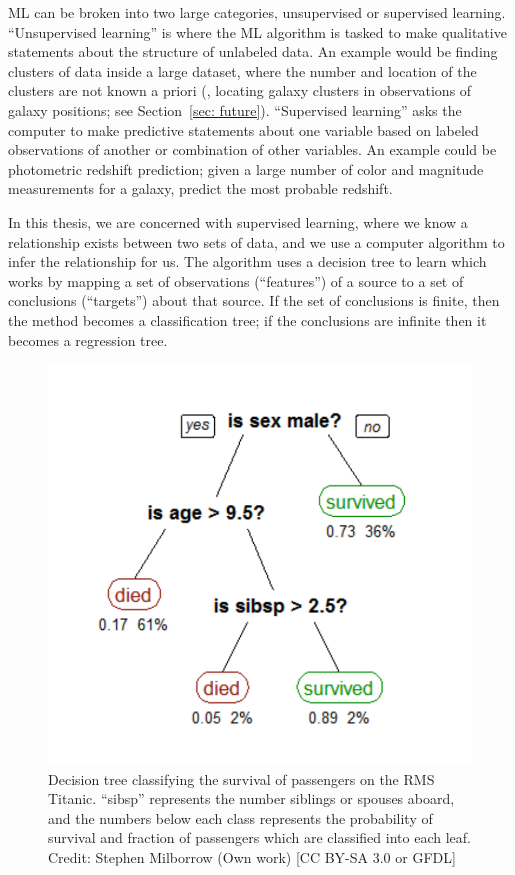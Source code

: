 ML can be broken into two large categories, unsupervised or supervised learning. ``Unsupervised learning'' is where the ML algorithm is tasked to make qualitative statements about the structure of unlabeled data. An example would be finding clusters of data inside a large dataset, where the number and location of the clusters are not known a priori (\eg, locating galaxy clusters in observations of galaxy positions; see Section~\ref{sec: future}). ``Supervised learning''  asks the computer to make predictive statements about one variable based on labeled observations of another or combination of other variables. An example could be photometric redshift prediction; given a large number of color and magnitude measurements for a galaxy, predict the most probable redshift.  

In this thesis, we are concerned with supervised learning, where we know a relationship exists between two sets of data, and we use a computer algorithm to infer the relationship for us. The algorithm uses a decision tree to learn which works by mapping a set of observations (``features'') of a source to a set of conclusions (``targets'') about that source. If the set of conclusions is finite, then the method becomes a classification tree; if the conclusions are infinite then it becomes a regression tree. 

\begin{figure}[!ht]
	\begin{center}
		\includegraphics[height=0.5\textheight]{figures/CART_tree_titanic_survivors.pdf} 
	\end{center}
	\caption[Decision tree classifying the survival of passengers on the RMS Titanic.]{Decision tree classifying the survival of passengers on the RMS Titanic. ``sibsp'' represents the number siblings or spouses aboard, and the numbers below each class represents the probability of survival and fraction of passengers which are classified into each leaf. Credit: Stephen Milborrow (Own work) [CC BY-SA 3.0 or GFDL]}
	\label{fig: cart tree} 
\end{figure}

